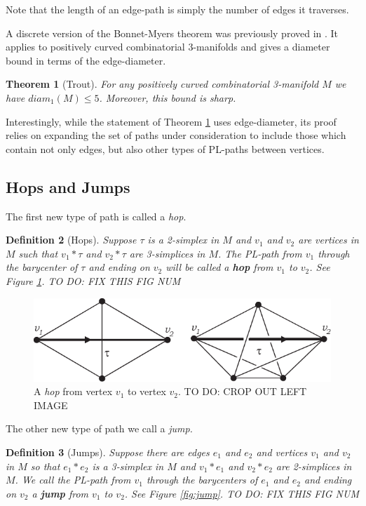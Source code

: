 \documentclass[12pt]{article}
\newtheorem{thm}{Theorem}[section]
\newtheorem{dfn}[thm]{Definition}
\begin{document}
\noindent Note that the length of an edge-path is simply the number of edges it traverses.

A discrete version of the Bonnet-Myers theorem was previously proved in \cite{Trout10}. It applies to positively curved combinatorial 3-manifolds and gives a diameter bound in terms of the edge-diameter.

\begin{thm}[Trout] For any positively curved combinatorial 3-manifold $M$ we have $diam_1(M)\leq 5$. Moreover, this bound is sharp.
\label{thm:discrete_BM}
\end{thm}

\noindent Interestingly, while the statement of Theorem \ref{thm:discrete_BM} uses edge-diameter, its proof relies on expanding the set of paths under consideration to include those which contain not only edges, but also other types of PL-paths between vertices.

\subsection{Hops and Jumps}
The first new type of path is called a {\em hop}.

\begin{dfn}[Hops] Suppose $\tau$ is a 2-simplex in $M$ and $v_1$ and $v_2$ are vertices in $M$ such that $v_1*\tau$ and $v_2*\tau$ are 3-simplices in $M$. The PL-path from $v_1$ through the barycenter of $\tau$ and ending on $v_2$ will be called a \textbf{hop} from $v_1$ to $v_2$. See Figure \ref{fig:hop}. TO DO: FIX THIS FIG NUM
\end{dfn}

\begin{figure}
	\label{fig:hop}
    \begin{center}
        \includegraphics[width=0.6\linewidth]{figures/hops.pdf}
        \caption{A {\em hop} from vertex $v_1$ to vertex $v_2$. TO DO: CROP OUT LEFT IMAGE}
    \end{center}
\end{figure}

\noindent The other new type of path we call a {\em jump.}

\begin{dfn}[Jumps] Suppose there are edges $e_1$ and $e_2$ and vertices $v_1$ and $v_2$ in $M$ so that $e_1*e_2$ is a 3-simplex in $M$ and $v_1*e_1$ and $v_2*e_2$ are 2-simplices in $M$. We call the PL-path from $v_1$ through the barycenters of $e_1$ and $e_2$ and ending on $v_2$ a \textbf{jump} from $v_1$ to $v_2$. See Figure \ref{fig:jump}. TO DO: FIX THIS FIG NUM
\end{dfn}
\end{document}
